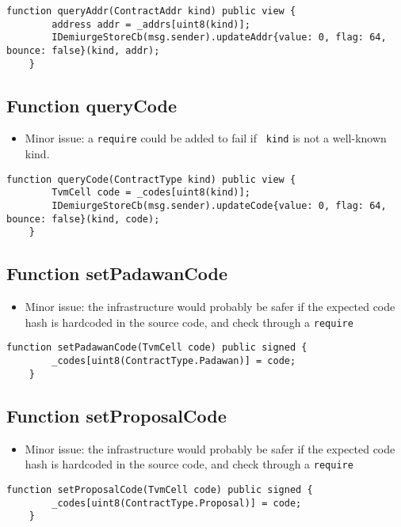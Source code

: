 \begin{lstlisting}[firstnumber=43]
    function queryAddr(ContractAddr kind) public view {
        address addr = _addrs[uint8(kind)];
        IDemiurgeStoreCb(msg.sender).updateAddr{value: 0, flag: 64, bounce: false}(kind, addr);
    }
\end{lstlisting}

\subsection{Function queryCode}

\begin{itemize}
\item Minor issue: a {\tt require} could be added to fail if {\tt
  kind} is not a well-known kind.
\end{itemize}

\begin{lstlisting}[firstnumber=38]
    function queryCode(ContractType kind) public view {
        TvmCell code = _codes[uint8(kind)];
        IDemiurgeStoreCb(msg.sender).updateCode{value: 0, flag: 64, bounce: false}(kind, code);
    }
\end{lstlisting}

\subsection{Function setPadawanCode}

\begin{itemize}
\item Minor issue: the infrastructure would probably be safer if the
  expected code hash is hardcoded in the source code, and check
  through a {\tt require}
\end{itemize}

\begin{lstlisting}[firstnumber=14]
    function setPadawanCode(TvmCell code) public signed {
        _codes[uint8(ContractType.Padawan)] = code;
    }
\end{lstlisting}

\subsection{Function setProposalCode}

\begin{itemize}
\item Minor issue: the infrastructure would probably be safer if the
  expected code hash is hardcoded in the source code, and check
  through a {\tt require}
\end{itemize}

\begin{lstlisting}[firstnumber=17]
    function setProposalCode(TvmCell code) public signed {
        _codes[uint8(ContractType.Proposal)] = code;
    }
\end{lstlisting}
